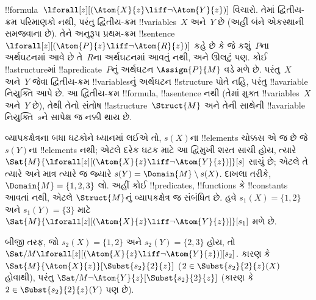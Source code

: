 \documentclass[../../../include/open-logic-section]{subfiles}
\begin{document}
\begin{ex}
  !!{formula}~$\lforall[z][(\Atom{X}{z} \liff \lnot
    \Atom{Y}{z})]$ વિચારો. તેમાં દ્વિતીય-ક્રમ પરિમાણકો નથી, પરંતુ
  દ્વિતીય-ક્રમ !!{variable}s~$X$ અને~$Y$ છે (અહીં બંને એકસ્થાની
  સમજવાના છે). તેને અનુરૂપ પ્રથમ-ક્રમ !!{sentence}
  $\lforall[z][(\Atom{P}{z} \liff \lnot \Atom{R}{z})]$ કહે છે કે
  જે કશું~$P$ના અર્થઘટનમાં આવે છે તે~$R$ના અર્થઘટનમાં આવતું નથી,
  અને ઊલટું પણ. કોઈ !!a{structure}માં !!a{predicate}~$P$નું અર્થઘટન
  $\Assign{P}{M}$ વડે મળે છે. પરંતુ~$X$ અને~$Y$ જેવા દ્વિતીય-ક્રમ
  !!{variable}sનું અર્થઘટન !!{structure} પોતે નહિ, પરંતુ
  !!a{variable} નિયુક્તિ આપે છે. આ દ્વિતીય-ક્રમ !!{formula},
  !!a{sentence} નથી (તેમાં મુક્ત !!{variable}s~$X$ અને~$Y$ છે), તેથી
  તેનો સંતોષ !!a{structure}~$\Struct{M}$ અને તેની સાથેની
  !!a{variable} નિયુક્તિ~$s$ને સાપેક્ષ જ નક્કી થાય છે.

  વ્યાપકક્ષેત્રના બધા ઘટકોને ધ્યાનમાં લઈએ તો, $s(X)$ના !!{element}s
  ચોક્કસ એ જ છે જે $s(Y)$ના !!{element}s નથી; એટલે દરેક ઘટક માટે આ
  દ્વિમુખી શરત સાચી હોય,
  ત્યારે $\Sat{M}{\lforall[z][(\Atom{X}{z} \liff \lnot
  \Atom{Y}{z})]}[s]$ સાચું છે; એટલે તે ત્યારે અને માત્ર ત્યારે જ
  જ્યારે $s(Y) = \Domain{M} \setminus s(X)$.
  દાખલા તરીકે,
  $\Domain{M} = \{1, 2, 3\}$ લો. અહીં કોઈ !!{predicate}s,
  !!{function}s કે !!{constant}s આવતાં નથી, એટલે
  $\Struct{M}$નું વ્યાપકક્ષેત્ર જ સંબંધિત છે. હવે
  $s_1(X) = \{1, 2\}$ અને $s_1(Y) = \{3\}$ માટે
  $\Sat{M}{\lforall[z][(\Atom{X}{z}
      \liff \lnot \Atom{Y}{z})]}[s_1]$ મળે છે.

  બીજી તરફ, જો $s_2(X) = \{1, 2\}$ અને $s_2(Y) = \{2, 3\}$ હોય,
  તો $\Sat/{M}{\lforall[z][(\Atom{X}{z} \liff \lnot
      \Atom{Y}{z})]}[s_2]$. કારણ કે
  $\Sat{M}{\Atom{X}{z}}[\Subst{s_2}{2}{z}]$ ($2 \in \Subst{s_2}{2}{z}(X)$ હોવાથી),
  પરંતુ $\Sat/{M}{\lnot \Atom{Y}{z}}[\Subst{s_2}{2}{z}]$
  (કારણ કે $2 \in \Subst{s_2}{2}{z}(Y)$ પણ છે).
\end{ex}
\end{document}
